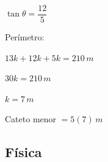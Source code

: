 \begin{enumerate}[resume]
\begin{tikzpicture}[scale=0.8]
	\end{tikzpicture}
	
	
	$\tan\theta=\dfrac{12}{5}$
	
	Perímetro:
	
	$13k+12k+5k=210 \, m$
	
	$30k=210 \, m$
	
	$k=7 \, m$
	
	Cateto menor $=5(7)\, m$
	
	
	\vspace{6mm}
	
\end{enumerate}





\subsection*{Física}

